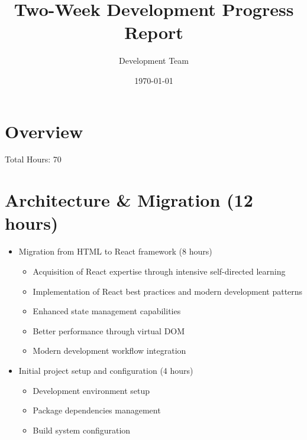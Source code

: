 \documentclass[11pt]{article}
\title{\textbf{Two-Week Development Progress Report}}
\author{Development Team}
\date{\today}
\begin{document}
\maketitle

\section*{Overview}
Total Hours: 70

\section{Architecture \& Migration (12 hours)}
\begin{itemize}[leftmargin=*]
  \item Migration from HTML to React framework (8 hours)
  \begin{itemize}
    \item Acquisition of React expertise through intensive self-directed learning
    \item Implementation of React best practices and modern development patterns
    \item Enhanced state management capabilities
    \item Better performance through virtual DOM
    \item Modern development workflow integration
  \end{itemize}
  \item Initial project setup and configuration (4 hours)
  \begin{itemize}
    \item Development environment setup
    \item Package dependencies management
    \item Build system configuration
  \end{itemize}
\end{itemize}
\end{document}
